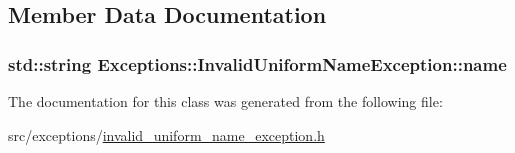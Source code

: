 \subsection{Member Data Documentation}
\hypertarget{class_exceptions_1_1_invalid_uniform_name_exception_a6cb6b066c8b98fff6eb2c90da9aa1fb0}{}
\subsubsection[{name}]{\setlength{\rightskip}{0pt plus 5cm}std\+::string Exceptions\+::\+Invalid\+Uniform\+Name\+Exception\+::name\hspace{0.3cm}{\ttfamily [private]}}\label{class_exceptions_1_1_invalid_uniform_name_exception_a6cb6b066c8b98fff6eb2c90da9aa1fb0}


The documentation for this class was generated from the following file\+:\begin{DoxyCompactItemize}
\item 
src/exceptions/\hyperlink{invalid__uniform__name__exception_8h}{invalid\+\_\+uniform\+\_\+name\+\_\+exception.\+h}\end{DoxyCompactItemize}
